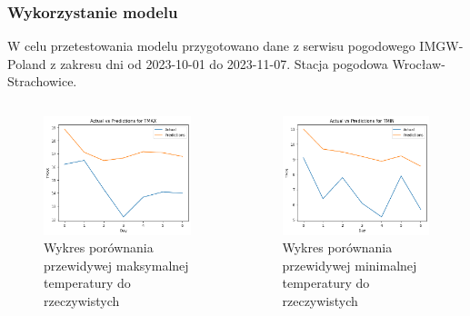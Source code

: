 \documentclass[usepdftitle=false,24pt]{beamer}
\begin{document}
\begin{frame}
    \frametitle{Wykorzystanie modelu}
    W celu przetestowania modelu przygotowano dane z serwisu pogodowego IMGW-Poland \cite{IMGW-Poland} z zakresu dni od 2023-10-01 do 2023-11-07. Stacja pogodowa Wrocław-Strachowice.

    \begin{columns}[T]
        \begin{column}{.5\textwidth}
            \begin{figure}
                \includegraphics[width=\textwidth]{images/tmax.png}
                \caption{Wykres porównania przewidywej maksymalnej temperatury do rzeczywistych}
            \end{figure}
        \end{column}
        \begin{column}{.5\textwidth}
            \begin{figure}
                \includegraphics[width=\textwidth]{images/tmin.png}
                \caption{Wykres porównania przewidywej minimalnej temperatury do rzeczywistych}
            \end{figure}
        \end{column}
    \end{columns}


\end{frame}
\end{document}
